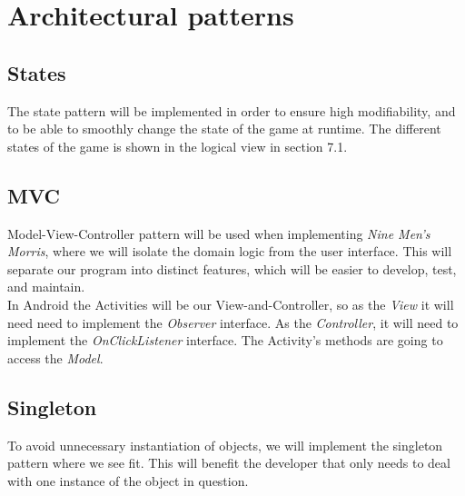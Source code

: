 \section{Architectural patterns}

\subsection{States}
The state pattern will be implemented in order to ensure high modifiability, and to be able to smoothly change the state of the game at runtime. The different states of the game is shown in the logical view in section 7.1.

\subsection{MVC}
Model-View-Controller pattern will be used when implementing \emph{Nine Men’s Morris}, where we will isolate the domain logic from the user interface. This will separate our program into distinct features, which will be easier to develop, test, and maintain. \\

In Android the Activities will be our View-and-Controller, so as the \emph{View} it will need need to implement the \emph{Observer} interface. As the \emph{Controller}, it will need to implement the \emph{OnClickListener} interface. The Activity’s methods are going to access the \emph{Model}.

\subsection{Singleton}
To avoid unnecessary instantiation of objects, we will implement the singleton pattern where we see fit. This will benefit the developer that only needs to deal with one instance of the object in question.




